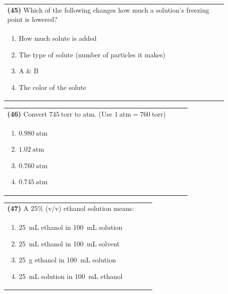 \documentclass{article}
\begin{document}
\noindent\begin{tabular}{|p{0.9\linewidth}|}
\hline
\textbf{(45)} Which of the following changes how much a solution’s freezing point is lowered?\\[0.2cm]
\begin{minipage}[t]{0.85\linewidth}
\begin{enumerate}[label=\alph*.]
\item How much solute is added
\item The type of solute (number of particles it makes)
\item A \& B
\item The color of the solute
\end{enumerate}
\end{minipage}\\[0.2cm]
\hline
\end{tabular}

\noindent\begin{tabular}{|p{0.9\linewidth}|}
\hline
\textbf{(46)} Convert $745~\text{torr}$ to atm. (Use $1~\text{atm}=760~\text{torr}$) \\
\begin{minipage}[t]{0.85\linewidth}
\begin{enumerate}[label=\alph*.]
    \item $0.980~\text{atm}$
    \item $1.02~\text{atm}$
    \item $0.760~\text{atm}$
    \item $0.745~\text{atm}$
\end{enumerate}
\end{minipage}\\[0.2cm]
\hline
\end{tabular}

\noindent\begin{tabular}{|p{0.9\linewidth}|}
\hline
\textbf{(47)} A 25\% (v/v) ethanol solution means:\\[0.2cm]
\begin{minipage}[t]{0.85\linewidth}
\begin{enumerate}[label=\alph*.]
\item 25~mL ethanol in 100~mL solution
\item 25~mL ethanol in 100~mL solvent
\item 25~g ethanol in 100~mL solution
\item 25~mL solution in 100~mL ethanol
\end{enumerate}
\end{minipage}\\[0.2cm]
\hline
\end{tabular}
\end{document}
